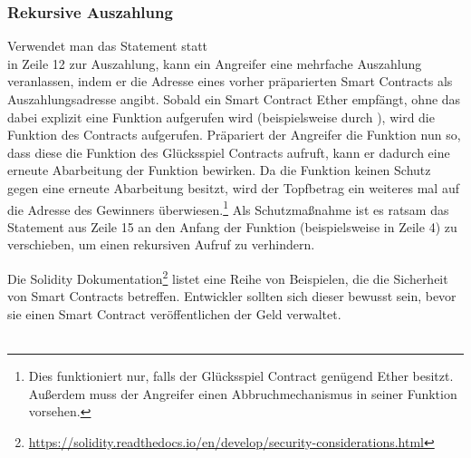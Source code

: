 \subsubsection{Rekursive Auszahlung}
Verwendet man das Statement  statt\\  in Zeile 12 zur Auszahlung, kann ein Angreifer eine mehrfache Auszahlung veranlassen, indem er die Adresse eines vorher präparierten Smart Contracts als Auszahlungsadresse angibt. Sobald ein Smart Contract Ether empfängt, ohne das dabei explizit eine Funktion aufgerufen wird (beispielsweise durch ), wird die  Funktion des Contracts aufgerufen. Präpariert der Angreifer die  Funktion nun so, dass diese die  Funktion des Glücksspiel Contracts aufruft, kann er dadurch eine erneute Abarbeitung der  Funktion bewirken. Da die  Funktion keinen Schutz gegen eine erneute Abarbeitung besitzt, wird der Topfbetrag ein weiteres mal auf die Adresse des Gewinners überwiesen.\footnote{Dies funktioniert nur, falls der Glücksspiel Contract genügend Ether besitzt. Außerdem muss der Angreifer einen Abbruchmechanismus in seiner  Funktion vorsehen.} Als Schutzmaßnahme ist es ratsam das Statement  aus Zeile 15 an den Anfang der Funktion (beispielsweise in Zeile 4) zu verschieben, um einen rekursiven Aufruf zu verhindern. 

Die Solidity Dokumentation\footnote{\url{https://solidity.readthedocs.io/en/develop/security-considerations.html}} listet eine Reihe von Beispielen, die die Sicherheit von Smart Contracts betreffen. Entwickler sollten sich dieser bewusst sein, bevor sie einen Smart Contract veröffentlichen der Geld verwaltet.\\\\


